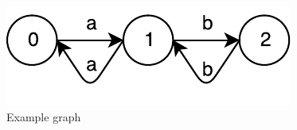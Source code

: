 \begin{figure}[h]
\includegraphics{graph}
\caption{Example graph}
\label{fig:graph}
\end{figure}










